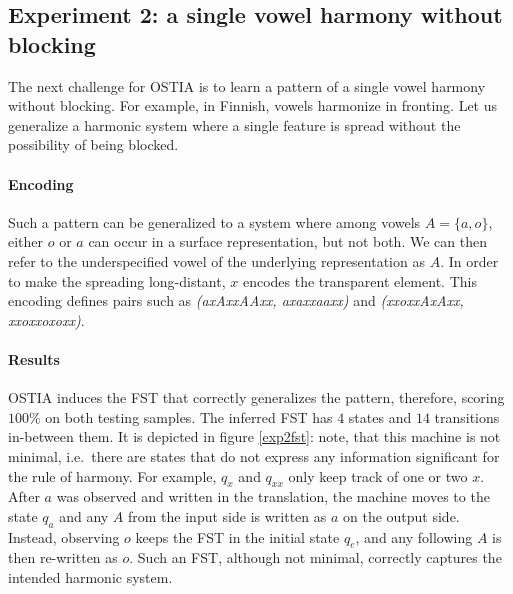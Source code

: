 \subsection{Experiment 2: a single vowel harmony without blocking}

The next challenge for OSTIA is to learn a pattern of a single vowel harmony without blocking.
For example, in Finnish, vowels harmonize in fronting.
Let us generalize a harmonic system where a single feature is spread without the possibility of being blocked.


\paragraph{Encoding}

Such a pattern can be generalized to a system where among vowels $A = \{a, o\}$, either $o$ or $a$ can occur in a surface representation, but not both.
We can then refer to the underspecified vowel of the underlying representation as $A$.
In order to make the spreading long-distant, $x$ encodes the transparent element.
This encoding defines pairs such as \emph{(axAxxAAxx, axaxxaaxx)} and \emph{(xxoxxAxAxx, xxoxxoxoxx)}.


\paragraph{Results}

OSTIA induces the FST that correctly generalizes the pattern, therefore, scoring $100$\% on both testing samples.
The inferred FST has $4$ states and $14$ transitions in-between them.
It is depicted in figure \ref{exp2fst}: note, that this machine is not minimal, i.e.\ there are states that do not express any information significant for the rule of harmony.
For example, $q_{x}$ and $q_{xx}$ only keep track of one or two $x$.
After $a$ was observed and written in the translation, the machine moves to the state $q_{a}$ and any $A$ from the input side is written as $a$ on the output side.
Instead, observing $o$ keeps the FST in the initial state $q_{e}$, and any following $A$ is then re-written as $o$.
Such an FST, although not minimal, correctly captures the intended harmonic system.

